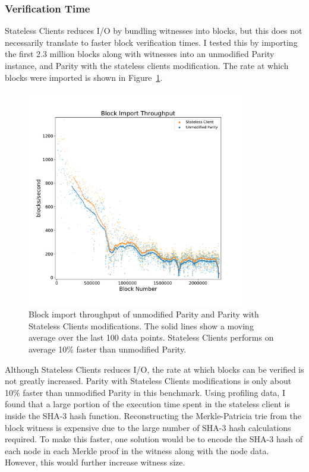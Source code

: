 \documentclass[12pt]{article}
\newcommand{\system}{stateless clients\xspace}
\newcommand{\System}{Stateless Clients\xspace}
\newcommand{\figurewidth}{0.85\textwidth}
\begin{document}
\subsubsection{Verification Time} \label{subsubsection:verificationtime}

\System reduces I/O by bundling witnesses into blocks, but this does not necessarily translate to faster block verification times. I tested this by importing the first 2.3 million blocks along with witnesses into an unmodified Parity instance, and Parity with the \system modification. The rate at which blocks were imported is shown in Figure~\ref{fig:throughput}.

\begin{figure}[H]
  \centering
  \includegraphics[width=\figurewidth]{../figures/results/graphs/background/throughput.pdf}
  \caption{Block import throughput of unmodified Parity and Parity with \System modifications. The solid lines show a moving average over the last 100 data points. \System performs on average 10\% faster than unmodified Parity.}
  \label{fig:throughput}
\end{figure}

Although \System reduces I/O, the rate at which blocks can be verified is not greatly increased. Parity with \System modifications is only about 10\% faster than unmodified Parity in this benchmark. Using profiling data, I found that a large portion of the execution time spent in the stateless client is inside the SHA-3 hash function. Reconstructing the Merkle-Patricia trie from the block witness is expensive due to the large number of SHA-3 hash calculations required. To make this faster, one solution would be to encode the SHA-3 hash of each node in each Merkle proof in the witness along with the node data. However, this would further increase witness size.
\end{document}
